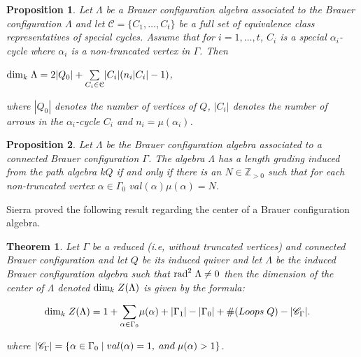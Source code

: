 \documentclass[10pt,twoside]{article}
\newcounter{neq}
\newtheorem{teor}{Theorem}
\newtheorem{prop}{Proposition}
\theoremstyle{definition}
\begin{document}
\addtocounter{prop}{3}
\begin{prop}\label{dimension}
\textit{Let $\Lambda$ be a Brauer configuration algebra associated to the Brauer configuration $\Lambda$ and let $\mathcal{C}=\{C_{1},\dots, C_{t}\}$ be a full set of equivalence class representatives of special cycles. Assume that for $i=1,\dots,t$, $C_{i}$ is a special $\alpha_{i}$-cycle where $\alpha_{i}$ is a non-truncated vertex in $\Gamma$}. \textit{Then}
\begin{center}
$\mathrm{dim}_{k}\hspace{0.1cm}\Lambda=2|Q_{0}|+\underset{C_{i}\in\mathcal{C}}{\sum}|C_{i}|(n_{i}|C_{i}|-1)$,

\end{center}
\textit{where $|Q_{0}|$ denotes the number of vertices of $Q$, $|C_{i}|$ denotes the number of arrows in the $\alpha_{i}$-cycle $C_{i}$ and $n_{i}=\mu(\alpha_{i})$}.
\end{prop}

\begin{prop}\label{grading}
\textit{Let $\Lambda$ be the Brauer configuration algebra associated to a connected Brauer configuration $\Gamma$. The algebra $\Lambda$ has a length grading induced from the path algebra $kQ$ if and only if there is an $N\in\mathbb{Z}_{>0}$ such that for each non-truncated vertex $\alpha\in\Gamma_{0}$ $val(\alpha)\mu(\alpha)=N$.}
\end{prop}
Sierra \cite{Sierra} proved the following result regarding the center of a Brauer configuration algebra.

\addtocounter{teor}{2}
\begin{teor}\label{Serra}
\textit{Let $\Gamma$ be a reduced (i.e, without truncated vertices) and connected Brauer configuration and let $Q$ be its induced quiver and let $\Lambda$ be the induced Brauer configuration algebra such that $\mathrm{rad}^{2}\hspace{0.1cm}\Lambda \neq 0$ then the dimension of the center of $\Lambda$ denoted $\mathrm{dim}_{k}\hspace{0.1cm}Z(\Lambda)$ is given by the formula}:

\begin{equation}\label{Sierra}
\begin{split}
\mathrm{dim}_{k}\hspace{0.1cm}Z(\Lambda)&=1+\underset{\alpha\in\Gamma_{0}}{\sum}\mu(\alpha)+|\Gamma_{1}|-|\Gamma_{0}|+\#(Loops\hspace{0.1cm} Q)-|\mathscr{C}_{\Gamma}|.
\end{split}
\end{equation}

\textit{where} $|\mathscr{C}_{\Gamma}|=\{\alpha\in\Gamma_{0}\mid val(\alpha)=1, \hspace{0.1cm}and\hspace{0.1cm} \mu(\alpha)>1\}$.

\end{teor}
\end{document}
